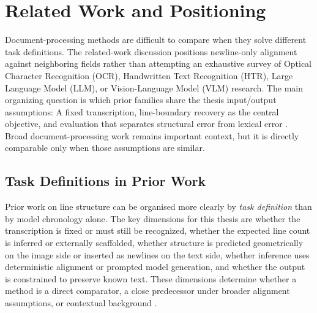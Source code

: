
\chapter{Related Work and Positioning}
\label{cha:state_of_the_art}

Document-processing methods are difficult to compare when they solve different task definitions. The related-work discussion positions newline-only alignment against neighboring fields rather than attempting an exhaustive survey of Optical Character Recognition (OCR), Handwritten Text Recognition (HTR), Large Language Model (LLM), or Vision-Language Model (VLM) research. The main organizing question is which prior families share the thesis input/output assumptions: A fixed transcription, line-boundary recovery as the central objective, and evaluation that separates structural error from lexical error . Broad document-processing work remains important context, but it is directly comparable only when those assumptions are similar.

\section{Task Definitions in Prior Work}
\label{sec:sota_task_definitions}

Prior work on line structure can be organised more clearly by \emph{task definition} than by model chronology alone. The key dimensions for this thesis are whether the transcription is fixed or must still be recognized, whether the expected line count is inferred or externally scaffolded, whether structure is predicted geometrically on the image side or inserted as newlines on the text side, whether inference uses deterministic alignment or prompted model generation, and whether the output is constrained to preserve known text. These dimensions determine whether a method is a direct comparator, a close predecessor under broader alignment assumptions, or contextual background .

